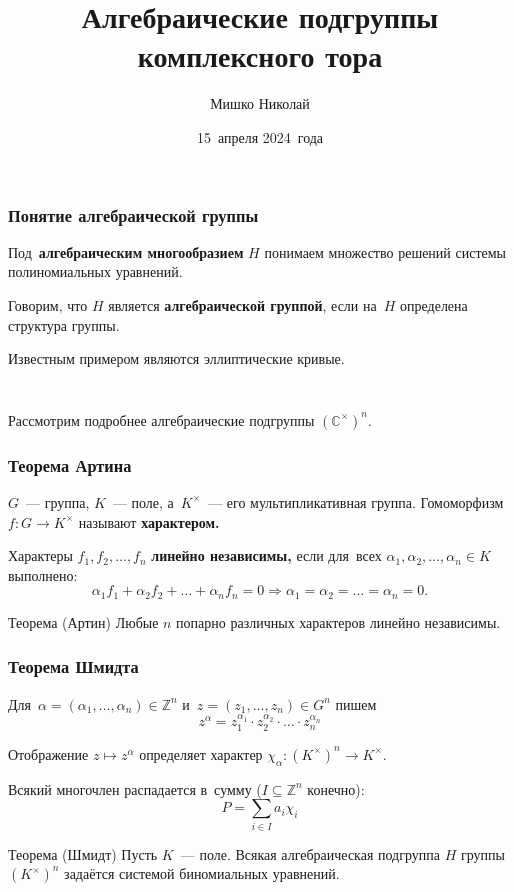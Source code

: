 \documentclass{beamer}
\title{Алгебраические подгруппы комплексного тора}
\author{Мишко Николай}
\institute{Сибирский федеральный университет\\Институт математики и фундаментальной информатики}
\date{15~апреля 2024~года}
\newcommand{\Z}{\mathbb{Z}}
\begin{document}
\begin{frame}
  \titlepage
\end{frame}

\begin{frame}
  \frametitle{Понятие алгебраической группы}

  Под~\textbf{алгебраическим многообразием} $H$ понимаем множество решений системы полиномиальных уравнений.

  Говорим, что $H$ является \textbf{алгебраической группой}, если на~$H$ определена структура группы.

  Известным примером являются эллиптические кривые.
  \begin{columns}[c]
    \begin{column}{0.3\textwidth}
      \begin{figure}
        
      \end{figure}
    \end{column}
  \end{columns}

  Рассмотрим подробнее алгебраические подгруппы $(\mathbb{C}^\times)^n$.
\end{frame}

\begin{frame}
  \frametitle{Теорема Артина}

  $G$~— группа, $K$~— поле, а~$K^{\times}$~— его мультипликативная группа.
  Гомоморфизм $f : G \rightarrow K^{\times}$ называют \textbf{характером.}

  Характеры $f_1, f_2, \ldots, f_n$ \textbf{линейно независимы,} если для~всех $\alpha_1, \alpha_2, \ldots, \alpha_n \in K$ выполнено:
  $$
      \alpha_1 f_1 + \alpha_2 f_2 + \ldots + \alpha_n f_n = 0 \Rightarrow \alpha_1 = \alpha_2 = \ldots = \alpha_n = 0.
  $$

  \begin{block}{Теорема (Артин)}
    Любые $n$ попарно различных характеров линейно независимы.
  \end{block}
\end{frame}

\begin{frame}
  \frametitle{Теорема Шмидта}

  Для~$\alpha = (\alpha_1, \ldots, \alpha_n) \in \Z^n$ и~$z = (z_1, \ldots, z_n) \in G^n$ пишем
  $$
    z^\alpha = z_1^{\alpha_1} \cdot z_2^{\alpha_2} \cdot \ldots \cdot z_n^{\alpha_n}
  $$

  Отображение $z \mapsto z^\alpha$ определяет характер $\chi_\alpha : (K^\times)^n \rightarrow K^\times$.

  Всякий многочлен распадается в~сумму ($I \subseteq \Z^n$ конечно):
  $$
    P = \sum_{i \in I} a_i \chi_i
  $$

  \begin{block}{Теорема (Шмидт)}
    Пусть $K$~— поле. Всякая алгебраическая подгруппа $H$ группы $(K^{\times})^n$ задаётся
    системой биномиальных уравнений.
  \end{block}
\end{frame}
\end{document}
